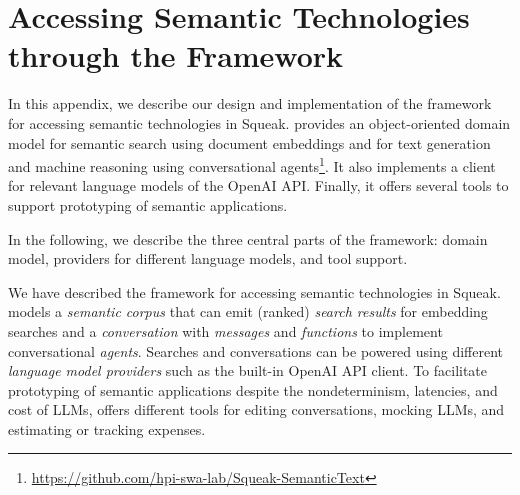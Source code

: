
\chapter{Accessing Semantic Technologies through the \semtex Framework}
\label{apx:semtex}

In this appendix, we describe our design and implementation of the \semtex framework for accessing semantic technologies in Squeak.
\semtex provides an object-oriented domain model for semantic search using document embeddings and for text generation and machine reasoning using conversational agents\footnote{\url{https://github.com/hpi-swa-lab/Squeak-SemanticText}}.
It also implements a client for relevant language models of the OpenAI API.
Finally, it offers several tools to support prototyping of semantic applications.

In the following, we describe the three central parts of the framework: domain model, providers for different language models, and tool support.


\begin{summary}
	We have described the \semtex framework for accessing semantic technologies in Squeak.
	\semtex models a \emph{semantic corpus} that can emit (ranked) \emph{search results} for embedding searches and a \emph{conversation} with \emph{messages} and \emph{functions} to implement conversational \emph{agents}.
	Searches and conversations can be powered using different \emph{language model providers} such as the built-in OpenAI API client.
	To facilitate prototyping of semantic applications despite the nondeterminism, latencies, and cost of LLMs, \semtex offers different tools for editing conversations, mocking LLMs, and estimating or tracking expenses.
\end{summary}
